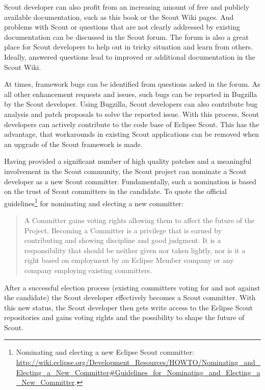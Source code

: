 \documentclass[a4paper,10pt,twoside]{book}
\begin{document}
Scout developer can also profit from an increasing amount of free and publicly available documentation, such as this book or the Scout Wiki pages. 
And problems with Scout or questions that are not clearly addressed by existing documentation can be discussed in the Scout forum. 
The forum is also a great place for Scout developers to help out in tricky situation and learn from others. 
Ideally, answered questions lead to improved or additional documentation in the Scout Wiki.

At times, framework bugs can be identified from questions asked in the forum. 
As all other enhancement requests and issues, such bugs can be reported in Bugzilla by the Scout developer. 
Using Bugzilla, Scout developers can also contribute bug analysis and patch proposals to solve the reported issue.
With this process, Scout developers can actively contribute to the code base of Eclipse Scout.
This has the advantage, that workarounds in existing Scout applications can be removed when an upgrade of the Scout framework is made.

Having provided a significant number of high quality patches and a meaningful involvement in the Scout community, the Scout project can nominate a Scout developer as a new Scout committer. 
Fundamentally, such a nomination is based on the trust of Scout committers in the candidate. 
To quote the official guidelines\footnote{
Nominating and electing a new Eclipse Scout committer: \url{http://wiki.eclipse.org/Development_Resources/HOWTO/Nominating_and_Electing_a_New_Committer#Guidelines_for_Nominating_and_Electing_a_New_Committer}.
} 
for nominating and electing a new committer:

\begin{quotation}
\begin{em}
A Committer gains voting rights allowing them to affect the future of the Project. 
Becoming a Committer is a privilege that is earned by contributing and showing discipline and good judgment. 
It is a responsibility that should be neither given nor taken lightly, nor is it a right based on employment by an Eclipse Member company or any company employing existing committers.
\end{em}
\end{quotation}

\noindent After a successful election process (existing committers voting for and not against the candidate) the Scout developer effectively becomes a Scout committer. 
With this new status, the Scout developer then gets write access to the Eclipse Scout repositories and gains voting rights and the possibility to shape the future of Scout. 
\end{document}
